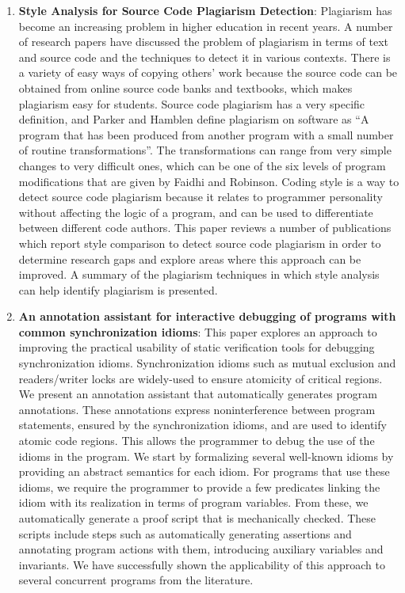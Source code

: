 \begin{englishtext}
\begin{enumerate}
    \item \textbf{Style Analysis for Source Code Plagiarism Detection}:
    Plagiarism has become an increasing problem in higher education in recent
    years. A number of research papers have discussed the problem of plagiarism
    in terms of text and source code and the techniques to detect it in various
    contexts. There is a variety of easy ways of copying others’ work because
    the source code can be obtained from online source code banks and textbooks,
    which makes plagiarism easy for students. Source code plagiarism has a very
    specific definition, and Parker and Hamblen define plagiarism on software as
    “A program that has been produced from another program with a small number
    of routine transformations”. The transformations can range from very simple
    changes to very difficult ones, which can be one of the six levels of
    program modifications that are given by Faidhi and Robinson. Coding style is
    a way to detect source code plagiarism because it relates to programmer
    personality without affecting the logic of a program, and can be used to
    differentiate between different code authors. This paper reviews a number of
    publications which report style comparison to detect source code plagiarism
    in order to determine research gaps and explore areas where this approach
    can be improved. A summary of the plagiarism techniques in which style
    analysis can help identify plagiarism is presented.
    \cite{codePlagiarismDetection}

    \item \textbf{An annotation assistant for interactive debugging of programs
    with common synchronization idioms}: This paper explores an approach to
    improving the practical usability of static verification tools for debugging
    synchronization idioms. Synchronization idioms such as mutual exclusion and
    readers/writer locks are widely-used to ensure atomicity of critical
    regions. We present an annotation assistant that automatically generates
    program annotations. These annotations express noninterference between
    program statements, ensured by the synchronization idioms, and are used to
    identify atomic code regions. This allows the programmer to debug the use of
    the idioms in the program. We start by formalizing several well-known idioms
    by providing an abstract semantics for each idiom. For programs that use
    these idioms, we require the programmer to provide a few predicates linking
    the idiom with its realization in terms of program variables. From these, we
    automatically generate a proof script that is mechanically checked. These
    scripts include steps such as automatically generating assertions and
    annotating program actions with them, introducing auxiliary variables and
    invariants. We have successfully shown the applicability of this approach to
    several concurrent programs from the literature.
    \cite{annotationAssistant}


\end{enumerate}
\end{englishtext}



